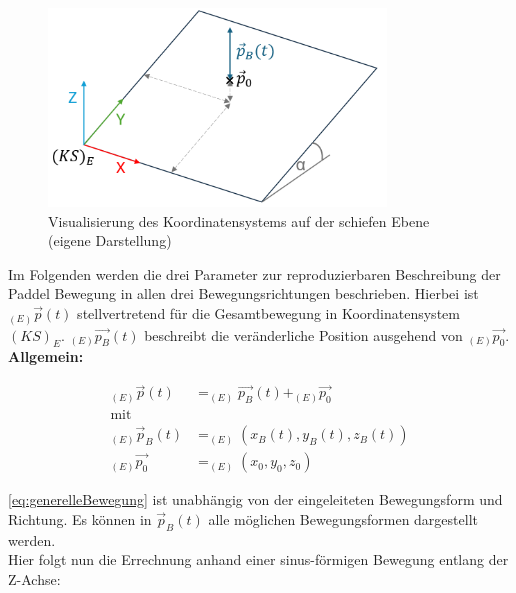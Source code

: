 \begin{figure}[h]
    \centering
    \includegraphics[width=0.8\textwidth]{bilder/KS_E-Koordinatensystem_Ebene.png}
    \caption[Visualisierung des Koordinatensystems auf der schiefen Ebene]{Visualisierung des Koordinatensystems auf der schiefen Ebene (eigene Darstellung)}\label{fig:VisualisierungKoordinatensystemSchiefe}
\end{figure}

\noindent Im Folgenden werden die drei Parameter zur reproduzierbaren Beschreibung der Paddel Bewegung in allen drei Bewegungsrichtungen beschrieben. Hierbei ist \( _{(E)}\vec{p}(t) \) stellvertretend für die Gesamtbewegung in Koordinatensystem \((KS)_E\). \(_{(E)}\vec{p_B} (t) \) beschreibt die veränderliche Position ausgehend von \(_{(E)}\vec{p_0}\).\\

\textbf{Allgemein:}


\begin{equation}
    \begin{aligned}
        _{(E)}\vec{p}(t) &= _{(E)}\vec{p_B}(t) + _{(E)}\vec{p_0}\\
        \text{mit}\\
        _{(E)}\vec{p}_B(t) &= _{(E)}\left(x_B(t), y_B(t), z_B(t)\right)\\
        _{(E)}\vec{p_0} &= _{(E)}\left(x_0, y_0, z_0\right)
    \end{aligned}
    \label{eq:generelleBewegung}
\end{equation}

\autoref{eq:generelleBewegung} ist unabhängig von der eingeleiteten Bewegungsform und Richtung. Es können in \(\vec{p}_B(t)\) alle möglichen Bewegungsformen dargestellt werden.\\

Hier folgt nun die Errechnung anhand einer sinus-förmigen Bewegung entlang der Z-Achse:

